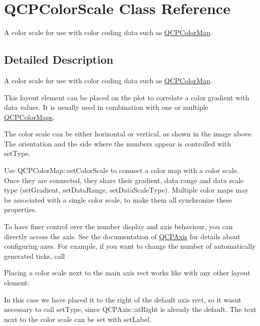 \hypertarget{class_q_c_p_color_scale}{}\section{Q\+C\+P\+Color\+Scale Class Reference}
\label{class_q_c_p_color_scale}


A color scale for use with color coding data such as \mbox{\hyperlink{class_q_c_p_color_map}{Q\+C\+P\+Color\+Map}}.  




\subsection{Detailed Description}
A color scale for use with color coding data such as \mbox{\hyperlink{class_q_c_p_color_map}{Q\+C\+P\+Color\+Map}}. 

This layout element can be placed on the plot to correlate a color gradient with data values. It is usually used in combination with one or multiple \mbox{\hyperlink{class_q_c_p_color_map}{Q\+C\+P\+Color\+Maps}}.



The color scale can be either horizontal or vertical, as shown in the image above. The orientation and the side where the numbers appear is controlled with set\+Type.

Use Q\+C\+P\+Color\+Map\+::set\+Color\+Scale to connect a color map with a color scale. Once they are connected, they share their gradient, data range and data scale type (set\+Gradient, set\+Data\+Range, set\+Data\+Scale\+Type). Multiple color maps may be associated with a single color scale, to make them all synchronize these properties.

To have finer control over the number display and axis behaviour, you can directly access the axis. See the documentation of \mbox{\hyperlink{class_q_c_p_axis}{Q\+C\+P\+Axis}} for details about configuring axes. For example, if you want to change the number of automatically generated ticks, call 
\begin{DoxyCodeInclude}
\end{DoxyCodeInclude}
 Placing a color scale next to the main axis rect works like with any other layout element\+: 
\begin{DoxyCodeInclude}
\end{DoxyCodeInclude}
In this case we have placed it to the right of the default axis rect, so it wasn\textquotesingle{}t necessary to call set\+Type, since Q\+C\+P\+Axis\+::at\+Right is already the default. The text next to the color scale can be set with set\+Label.

